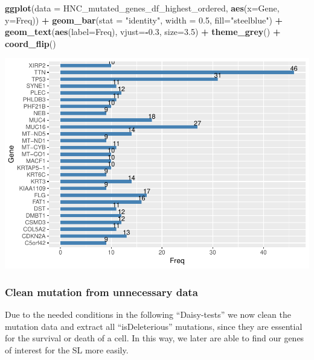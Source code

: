 \documentclass[]{article}
\newenvironment{Shaded}{\begin{snugshade}}{\end{snugshade}}
\newcommand{\KeywordTok}[1]{\textcolor[rgb]{0.13,0.29,0.53}{\textbf{#1}}}
\newcommand{\DataTypeTok}[1]{\textcolor[rgb]{0.13,0.29,0.53}{#1}}
\newcommand{\FloatTok}[1]{\textcolor[rgb]{0.00,0.00,0.81}{#1}}
\newcommand{\StringTok}[1]{\textcolor[rgb]{0.31,0.60,0.02}{#1}}
\newcommand{\OperatorTok}[1]{\textcolor[rgb]{0.81,0.36,0.00}{\textbf{#1}}}
\newcommand{\NormalTok}[1]{#1}
\begin{document}
\begin{Shaded}
\begin{Highlighting}[]
\KeywordTok{ggplot}\NormalTok{(}\DataTypeTok{data =}\NormalTok{ HNC_mutated_genes_df_highest_ordered, }\KeywordTok{aes}\NormalTok{(}\DataTypeTok{x=}\NormalTok{Gene, }\DataTypeTok{y=}\NormalTok{Freq)) }\OperatorTok{+}
\StringTok{  }\KeywordTok{geom_bar}\NormalTok{(}\DataTypeTok{stat =} \StringTok{"identity"}\NormalTok{, }\DataTypeTok{width =} \FloatTok{0.5}\NormalTok{, }\DataTypeTok{fill=}\StringTok{"steelblue"}\NormalTok{) }\OperatorTok{+}
\StringTok{  }\KeywordTok{geom_text}\NormalTok{(}\KeywordTok{aes}\NormalTok{(}\DataTypeTok{label=}\NormalTok{Freq), }\DataTypeTok{vjust=}\OperatorTok{-}\FloatTok{0.3}\NormalTok{, }\DataTypeTok{size=}\FloatTok{3.5}\NormalTok{) }\OperatorTok{+}
\StringTok{  }\KeywordTok{theme_grey}\NormalTok{() }\OperatorTok{+}
\StringTok{  }\KeywordTok{coord_flip}\NormalTok{()}
\end{Highlighting}
\end{Shaded}

\includegraphics{Project_HNC_files/figure-latex/1_muation_frequency4-1.pdf}

\subsubsection{Clean mutation from unnecessary
data}\label{clean-mutation-from-unnecessary-data}

Due to the needed conditions in the following ``Daisy-tests'' we now
clean the mutation data and extract all ``isDeleterious'' mutations,
since they are essential for the survival or death of a cell. In this
way, we later are able to find our genes of interest for the SL more
easily.
\end{document}
